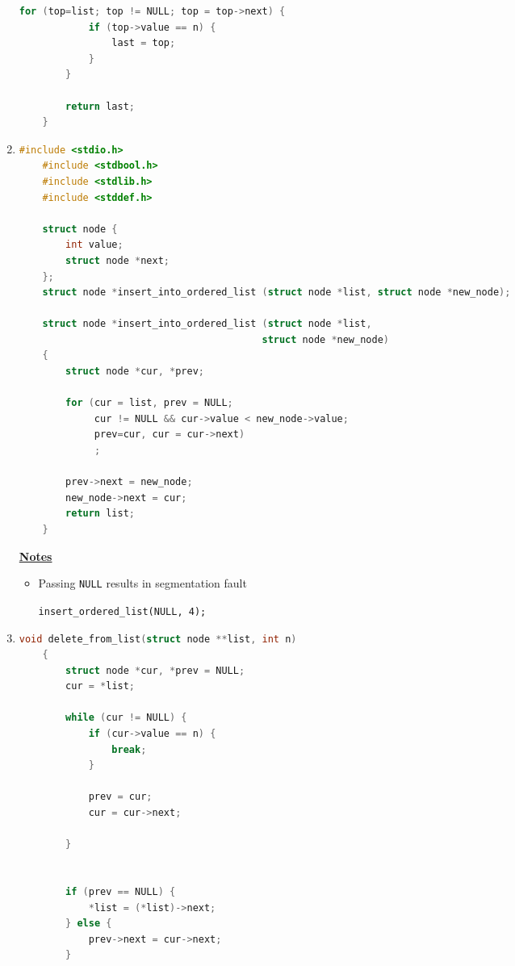 \documentclass[12pt]{article}
\begin{document}
\begin{enumerate}[1.]
\begin{lstlisting}[language=c]
        for (top=list; top != NULL; top = top->next) {
            if (top->value == n) {
                last = top;
            }
        }

        return last;
    }
\end{lstlisting}

    \item

\begin{lstlisting}[language=c]
    #include <stdio.h>
    #include <stdbool.h>
    #include <stdlib.h>
    #include <stddef.h>

    struct node {
        int value;
        struct node *next;
    };
    struct node *insert_into_ordered_list (struct node *list, struct node *new_node);

    struct node *insert_into_ordered_list (struct node *list,
                                          struct node *new_node)
    {
        struct node *cur, *prev;

        for (cur = list, prev = NULL;
             cur != NULL && cur->value < new_node->value;
             prev=cur, cur = cur->next)
             ;

        prev->next = new_node;
        new_node->next = cur;
        return list;
    }

\end{lstlisting}

    \bigskip

    \underline{\textbf{Notes}}

    \begin{itemize}
        \item Passing \texttt{NULL} results in segmentation fault

        \bigskip

        \texttt{insert\_ordered\_list(NULL, 4);}
    \end{itemize}

    \item

\begin{lstlisting}[language=c]
    void delete_from_list(struct node **list, int n)
    {
        struct node *cur, *prev = NULL;
        cur = *list;

        while (cur != NULL) {
            if (cur->value == n) {
                break;
            }

            prev = cur;
            cur = cur->next;

        }


        if (prev == NULL) {
            *list = (*list)->next;
        } else {
            prev->next = cur->next;
        }


\end{lstlisting}
\end{enumerate}
\end{document}
